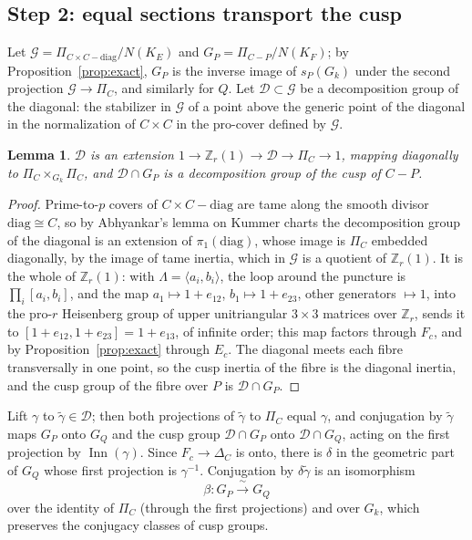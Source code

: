 \documentclass[11pt]{amsart}
\newtheorem{lemma}[thm]{Lemma}
\theoremstyle{remark}
\newcommand{\Z}{\mathbb Z}
\DeclareMathOperator{\Inn}{Inn}
\begin{document}
\subsection{Step 2: equal sections transport the cusp}
Let $\mathcal G=\Pi_{C\times C-\mathrm{diag}}/N(K_E)$ and $G_P=\Pi_{C-P}/N(K_F)$; by Proposition~\ref{prop:exact}, $G_P$ is the inverse image of $s_P(G_k)$ under the second projection $\mathcal G\to\Pi_C$, and similarly for $Q$. Let $\mathcal D\subset\mathcal G$ be a decomposition group of the diagonal: the stabilizer in $\mathcal G$ of a point above the generic point of the diagonal in the normalization of $C\times C$ in the pro-cover defined by $\mathcal G$.

\begin{lemma}\label{lem:diag}
$\mathcal D$ is an extension $1\to\Z_r(1)\to\mathcal D\to\Pi_C\to1$, mapping diagonally to $\Pi_C\times_{G_k}\Pi_C$, and $\mathcal D\cap G_P$ is a decomposition group of the cusp of $C-P$.
\end{lemma}

\begin{proof}
Prime-to-$p$ covers of $C\times C-\mathrm{diag}$ are tame along the smooth divisor $\mathrm{diag}\cong C$, so by Abhyankar's lemma on Kummer charts \cite[XIII, Proposition 5.2]{SGA1} the decomposition group of the diagonal is an extension of $\pi_1(\mathrm{diag})$, whose image is $\Pi_C$ embedded diagonally, by the image of tame inertia, which in $\mathcal G$ is a quotient of $\Z_r(1)$. It is the whole of $\Z_r(1)$: with $\Lambda=\langle a_i,b_i\rangle$, the loop around the puncture is $\prod_i[a_i,b_i]$, and the map $a_1\mapsto1+e_{12}$, $b_1\mapsto1+e_{23}$, other generators $\mapsto1$, into the pro-$r$ Heisenberg group of upper unitriangular $3\times3$ matrices over $\Z_r$, sends it to $[1+e_{12},1+e_{23}]=1+e_{13}$, of infinite order; this map factors through $F_c$, and by Proposition~\ref{prop:exact} through $E_c$. The diagonal meets each fibre transversally in one point, so the cusp inertia of the fibre is the diagonal inertia, and the cusp group of the fibre over $P$ is $\mathcal D\cap G_P$.
\end{proof}

Lift $\gamma$ to $\tilde\gamma\in\mathcal D$; then both projections of $\tilde\gamma$ to $\Pi_C$ equal $\gamma$, and conjugation by $\tilde\gamma$ maps $G_P$ onto $G_Q$ and the cusp group $\mathcal D\cap G_P$ onto $\mathcal D\cap G_Q$, acting on the first projection by $\Inn(\gamma)$. Since $F_c\to\Delta_C$ is onto, there is $\delta$ in the geometric part of $G_Q$ whose first projection is $\gamma^{-1}$. Conjugation by $\delta\tilde\gamma$ is an isomorphism
\[
 \beta\colon G_P\xrightarrow{\ \sim\ }G_Q
\]
over the identity of $\Pi_C$ (through the first projections) and over $G_k$, which preserves the conjugacy classes of cusp groups.
\end{document}
